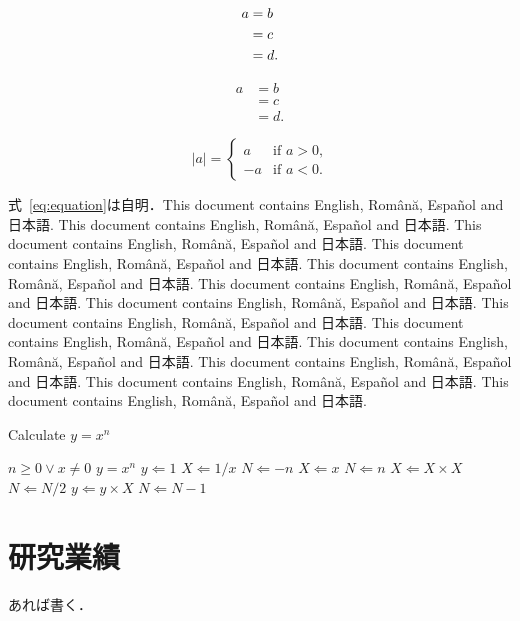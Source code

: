 \documentclass[
	10pt,
	a4j,		%
	twocolumn,	%
	uplatex
]{jsarticle}
\begin{document}
\begin{align}
a &= b	\\
&= c	\notag\\
&= d.
\end{align}

\begin{equation}
\begin{aligned}
a &= b	\\
&= c	\\
&= d.
\end{aligned}
\label{eq:equation}
\end{equation}

\begin{equation}
|a| =
\begin{cases}
a  & \text{if $a>0$,}\\
-a & \text{if $a<0$.}
\end{cases}
\end{equation}

式~\eqref{eq:equation}は自明．This document contains English, Română, Español and 日本語. This document contains English, Română, Español and 日本語. This document contains English, Română, Español and 日本語. This document contains English, Română, Español and 日本語. This document contains English, Română, Español and 日本語. This document contains English, Română, Español and 日本語. This document contains English, Română, Español and 日本語. This document contains English, Română, Español and 日本語. This document contains English, Română, Español and 日本語. This document contains English, Română, Español and 日本語. This document contains English, Română, Español and 日本語. This document contains English, Română, Español and 日本語. This document contains English, Română, Español and 日本語. 

\begin{algorithm}[t]
	\caption{Calculate $y = x^n$}
	\label{alg:algorithm}
	\begin{algorithmic}[1]
		\Require	$n \geq 0 \vee x \neq 0$
		\Ensure	$y = x^n$
		\State $y \Leftarrow 1$
				\State $X \Leftarrow 1 / x$
				\State $N \Leftarrow -n$
			\Else
				\State $X \Leftarrow x$
				\State $N \Leftarrow n$
			\EndIf
				\State $X \Leftarrow X \times X$
				\State $N \Leftarrow N / 2$
			\Else[$N$ is odd]
				\State $y \Leftarrow y \times X$
				\State $N \Leftarrow N - 1$
			\EndIf
		\EndWhile
	\end{algorithmic}
\end{algorithm}


{\footnotesize
	
}

\section*{研究業績}
あれば書く．
\end{document}
